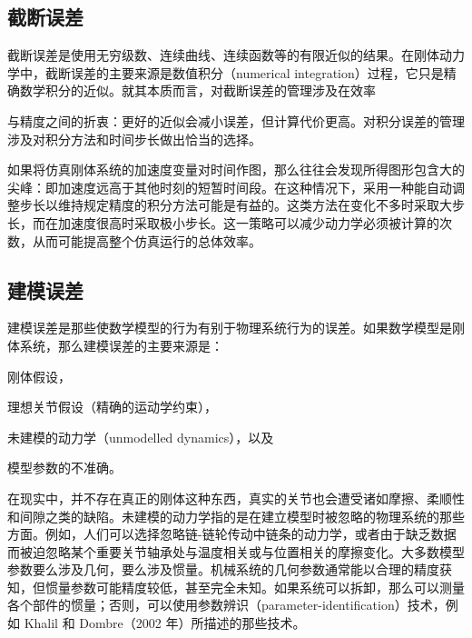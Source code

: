 \documentclass[10pt,a4paper]{book}
\theoremstyle{thmstyle} %
\theoremstyle{defstyle} %
\theoremstyle{prostyle} %
\begin{document}
\subsection{截断误差}





截断误差是使用无穷级数、连续曲线、连续函数等的有限近似的结果。在刚体动力学中，截断误差的主要来源是数值积分（numerical integration）过程，它只是精确数学积分的近似。就其本质而言，对截断误差的管理涉及在效率



与精度之间的折衷：更好的近似会减小误差，但计算代价更高。对积分误差的管理涉及对积分方法和时间步长做出恰当的选择。



如果将仿真刚体系统的加速度变量对时间作图，那么往往会发现所得图形包含大的尖峰：即加速度远高于其他时刻的短暂时间段。在这种情况下，采用一种能自动调整步长以维持规定精度的积分方法可能是有益的。这类方法在变化不多时采取大步长，而在加速度很高时采取极小步长。这一策略可以减少动力学必须被计算的次数，从而可能提高整个仿真运行的总体效率。



\subsection{建模误差}





建模误差是那些使数学模型的行为有别于物理系统行为的误差。如果数学模型是刚体系统，那么建模误差的主要来源是：



刚体假设，



理想关节假设（精确的运动学约束），



未建模的动力学（unmodelled dynamics），以及



模型参数的不准确。



在现实中，并不存在真正的刚体这种东西，真实的关节也会遭受诸如摩擦、柔顺性和间隙之类的缺陷。未建模的动力学指的是在建立模型时被忽略的物理系统的那些方面。例如，人们可以选择忽略链-链轮传动中链条的动力学，或者由于缺乏数据而被迫忽略某个重要关节轴承处与温度相关或与位置相关的摩擦变化。大多数模型参数要么涉及几何，要么涉及惯量。机械系统的几何参数通常能以合理的精度获知，但惯量参数可能精度较低，甚至完全未知。如果系统可以拆卸，那么可以测量各个部件的惯量；否则，可以使用参数辨识（parameter-identification）技术，例如 Khalil 和 Dombre（2002 年）所描述的那些技术。
\end{document}
